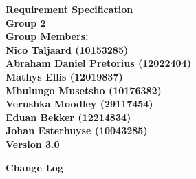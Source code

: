 \documentclass[12pt]{article}
\newcommand{\Title}{Requirement Specification} %
\begin{document}
	\vspace{4em}
	
	\begin{center}%
	
	  \LARGE \bf \Title \\[4em]
	  \LARGE {\bf Group 2}\\[1em]
	  \LARGE {\bf Group Members:}\\[2em]
	  \large
	     Nico Taljaard					(10153285) \\[1em]
	     Abraham Daniel Pretorius		(12022404) \\[1em]
	     Mathys Ellis					(12019837) \\[1em]
	     Mbulungo Musetsho				(10176382) \\[1em]
	     Verushka Moodley				(29117454) \\[1em]
	     Eduan Bekker					(12214834) \\[1em]
	     Johan Esterhuyse				(10043285) \\[9em]
	     {\bf Version 3.0}
	    
	\end{center}
	
	\newpage
		{\LARGE \bf Change Log}\\[2em]
		
\end{document}
